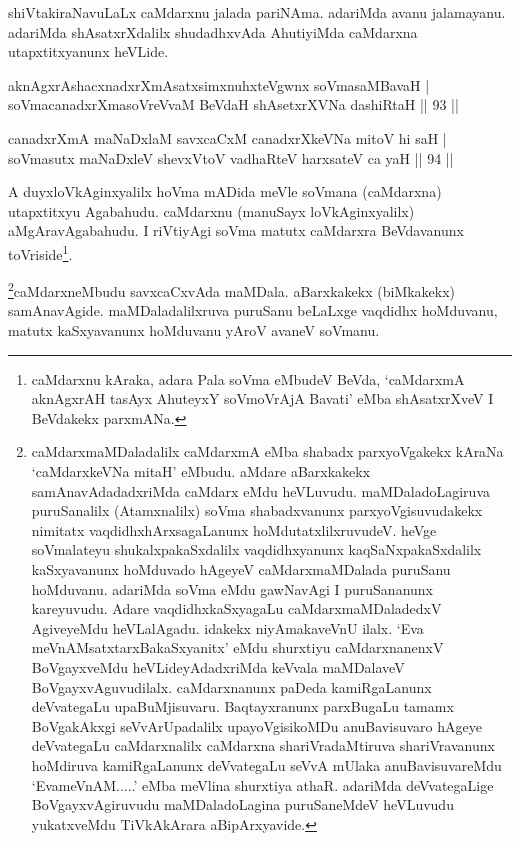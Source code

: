 \begin{artha}
shiVtakiraNavuLaLx caMdarxnu jalada pariNAma. adariMda avanu 
jalamayanu. adariMda shAsatxrXdalilx shudadhxvAda AhutiyiMda caMdarxna 
utapxtitxyanunx heVLide.
\end{artha}


\begin{shl}
aknAgxrAshacxnadxrXmAsatxsimxnuhxteV\s gwnx soVmasaMBavaH | \\
soVmacanadxrXmasoVreVvaM BeVdaH shAsetxrXVNa dashiRtaH \hfill|| 93 || 
\end{shl}

\begin{shl}
canadxrXmA maNaDxlaM savxcaCxM canadxrXkeVNa mitoV hi saH | \\
soVmasutx maNaDxleV shevxVtoV vadhaRteV harxsateV ca yaH \hfill|| 94 || 
\end{shl}

\begin{artha}
A duyxloVkAginxyalilx hoVma mADida meVle soVmana (caMdarxna) 
utapxtitxyu Agabahudu. caMdarxnu (manuSayx loVkAginxyalilx) 
aMgAravAgabahudu. I riVtiyAgi soVma matutx caMdarxra BeVdavanunx 
toVriside\footnote{caMdarxnu kAraka, adara Pala soVma eMbudeV BeVda, 
`caMdarxmA aknAgxrAH tasAyx AhuteyxY soVmoVrAjA Bavati' eMba shAsatxrXveV I BeVdakekx parxmANa.}.
\end{artha}

\begin{artha}
\footnote{caMdarxmaMDaladalilx caMdarxmA eMba shabadx parxyoVgakekx kAraNa `caMdarxkeVNa mitaH' eMbudu. aMdare aBarxkakekx samAnavAdadadxriMda caMdarx eMdu heVLuvudu. maMDaladoLagiruva puruSanalilx (Atamxnalilx) soVma shabadxvanunx parxyoVgisuvudakekx nimitatx vaqdidhxhArxsagaLanunx hoMdutatxlilxruvudeV. heVge soVmalateyu shukalxpakaSxdalilx vaqdidhxyanunx kaqSaNxpakaSxdalilx kaSxyavanunx hoMduvado hAgeyeV caMdarxmaMDalada puruSanu hoMduvanu. adariMda soVma eMdu gawNavAgi I puruSananunx kareyuvudu. Adare vaqdidhxkaSxyagaLu caMdarxmaMDaladedxV AgiveyeMdu heVLalAgadu. idakekx niyAmakaveVnU ilalx. `Eva meVnAMsatxtarxBakaSxyanitx' eMdu shurxtiyu caMdarxnanenxV BoVgayxveMdu heVLideyAdadxriMda keVvala maMDalaveV BoVgayxvAguvudilalx. caMdarxnanunx paDeda kamiRgaLanunx deVvategaLu upaBuMjisuvaru. Baqtayxranunx parxBugaLu tamamx BoVgakAkxgi seVvArUpadalilx upayoVgisikoMDu anuBavisuvaro hAgeye deVvategaLu caMdarxnalilx caMdarxna shariVradaMtiruva shariVravanunx hoMdiruva kamiRgaLanunx deVvategaLu seVvA mUlaka anuBavisuvareMdu `EvameVnAM.....' eMba meVlina shurxtiya athaR. adariMda deVvategaLige BoVgayxvAgiruvudu maMDaladoLagina puruSaneMdeV heVLuvudu yukatxveMdu TiVkAkArara aBipArxyavide.}caMdarxneMbudu savxcaCxvAda maMDala. aBarxkakekx (biMkakekx) samAnavAgide. maMDaladalilxruva puruSanu beLaLxge vaqdidhx hoMduvanu, matutx kaSxyavanunx hoMduvanu yAroV avaneV soVmanu.
\end{artha}

